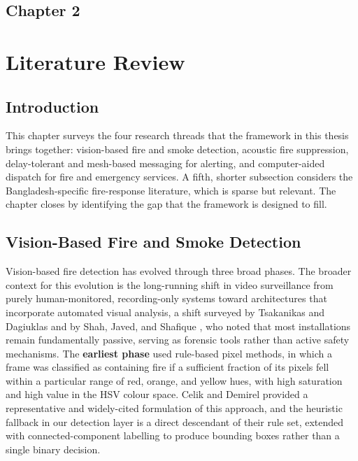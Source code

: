 \begin{center}
    \section*{\fontsize{20}{20}\selectfont Chapter 2}
\end{center}
\vspace{10mm}
\section{Literature Review}

\subsection{Introduction}

This chapter surveys the four research threads that the framework in this thesis brings together: vision-based fire and smoke detection, acoustic fire suppression, delay-tolerant and mesh-based messaging for alerting, and computer-aided dispatch for fire and emergency services. A fifth, shorter subsection considers the Bangladesh-specific fire-response literature, which is sparse but relevant. The chapter closes by identifying the gap that the framework is designed to fill.

\subsection{Vision-Based Fire and Smoke Detection}

Vision-based fire detection has evolved through three broad phases. The broader context for this evolution is the long-running shift in video surveillance from purely human-monitored, recording-only systems toward architectures that incorporate automated visual analysis, a shift surveyed by Tsakanikas and Dagiuklas \cite{Tsakanikas2018} and by Shah, Javed, and Shafique \cite{Shah2007}, who noted that most installations remain fundamentally passive, serving as forensic tools rather than active safety mechanisms. The \textbf{earliest phase} used rule-based pixel methods, in which a frame was classified as containing fire if a sufficient fraction of its pixels fell within a particular range of red, orange, and yellow hues, with high saturation and high value in the HSV colour space. Celik and Demirel \cite{celik2010fire} provided a representative and widely-cited formulation of this approach, and the heuristic fallback in our detection layer is a direct descendant of their rule set, extended with connected-component labelling to produce bounding boxes rather than a single binary decision.

